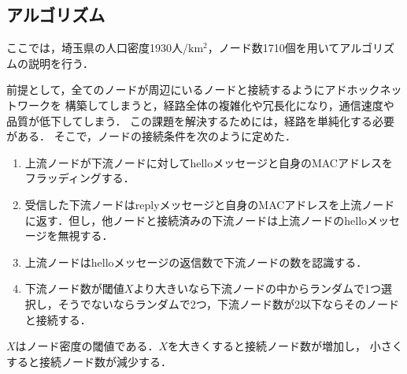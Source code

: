 \documentclass[a4paper, 11pt]{ltjsarticle}
\begin{document}


\clearpage
\subsection{アルゴリズム}
ここでは，埼玉県の人口密度1930人/$\mathrm{km^2}$，ノード数1710個を用いてアルゴリズムの説明を行う．

前提として，全てのノードが周辺にいるノードと接続するようにアドホックネットワークを
構築してしまうと，経路全体の複雑化や冗長化になり，通信速度や品質が低下してしまう．
この課題を解決するためには，経路を単純化する必要がある．
そこで，ノードの接続条件を次のように定めた．

\begin{enumerate}[label=\ding{\numexpr171+\arabic*}]
  \item 上流ノードが下流ノードに対してhelloメッセージと自身のMACアドレスをフラッディングする．
  \item 受信した下流ノードはreplyメッセージと自身のMACアドレスを上流ノードに返す．但し，他ノードと接続済みの下流ノードは上流ノードのhelloメッセージを無視する．
  \item 上流ノードはhelloメッセージの返信数で下流ノードの数を認識する．
  \item 下流ノード数が閾値$X$より大きいなら下流ノードの中からランダムで1つ選択し，そうでないならランダムで2つ，下流ノード数が2以下ならそのノードと接続する．
\end{enumerate}
$X$はノード密度の閾値である．$X$を大きくすると接続ノード数が増加し，
小さくすると接続ノード数が減少する．
\end{document}
